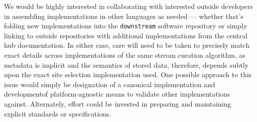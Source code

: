 We would be highly interested in collaborating with interested outside developers in assembling implementations in other languages as needed --- whether that's folding new implementations into the \texttt{downstream} software repository or simply linking to outside repositories with additional implementations from the central hub documentation.
In either case, care will need to be taken to precisely match exact details across implementations of the same stream curation algorithm, as  metadata is implicit and the semantics of stored data, therefore, depends subtly upon the exact site selection implementation used.
One possible approach to this issue would simply be designation of a canonical implementation and developmentof platform-agnostic means to validate other implementations against.
Alternately, effort could be invested in preparing and maintaining explicit standards or specifications.

